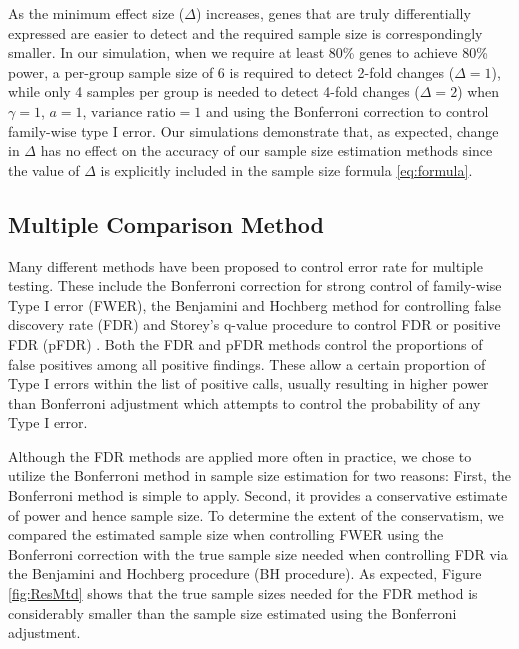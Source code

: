 \documentclass[12pt]{article}
\begin{document}
As the minimum effect size ($\Delta$) increases, genes that are
truly differentially expressed are easier to detect and the
required sample size is correspondingly smaller.  In our
simulation, when we require at least 80\% genes to achieve 80\%
power, a per-group sample size of 6 is required to detect 2-fold
changes ($\Delta = 1$), while only 4 samples per group is needed
to detect 4-fold changes ($\Delta = 2$) when $\gamma=1$, $a=1$,
$\text{variance ratio}=1$ and using the Bonferroni correction to
control family-wise type I error. Our simulations demonstrate
that, as expected, change in $\Delta$ has no effect on the
accuracy of our sample size estimation methods since the value of
$\Delta$ is explicitly included in the sample size formula
\ref{eq:formula}.

\subsection{Multiple Comparison Method}

Many different methods have been proposed to control error rate for
multiple testing.  These include the Bonferroni correction for
strong control of family-wise Type I error (FWER), the Benjamini
and
Hochberg \citeyearpar{Benjamini95} method for controlling false
discovery rate (FDR) and Storey's \citeyearpar{Storey02} q-value
procedure to control FDR or positive FDR (pFDR) .  Both the FDR and
pFDR methods control the proportions of false positives among all
positive findings.  These allow a certain proportion of Type I
errors within the list of positive calls, usually resulting in
higher power than Bonferroni adjustment which attempts to control
the probability of any Type I error.

Although the FDR methods are applied more often in practice, we
chose to utilize the Bonferroni method in sample size estimation for
two reasons: First, the Bonferroni method is simple to apply.
Second, it provides a conservative estimate of power and hence
sample size.  To determine the extent of the conservatism, we
compared the estimated sample size when controlling FWER using the
Bonferroni correction
with the true sample size needed when controlling FDR via the
Benjamini and Hochberg \citeyearpar{Benjamini95} procedure (BH
procedure). As
expected, Figure \ref{fig:ResMtd} shows that the true sample sizes
needed for the FDR method is considerably smaller than the sample
size estimated using the Bonferroni adjustment.
\end{document}
